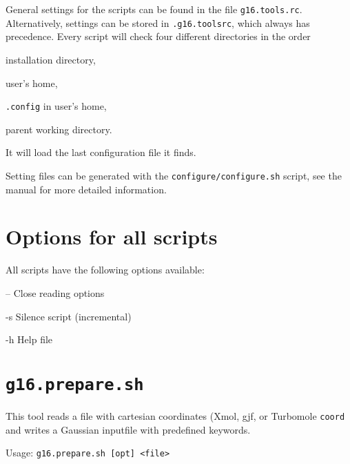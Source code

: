 \documentclass[final, a4paper, columns=3, margin=1.0cm, 10pt]{refcard}
\begin{document}
General settings for the scripts can be found in the file \texttt{g16.tools.rc}.
Alternatively, settings can be stored in \texttt{.g16.toolsrc}, 
which always has precedence.
Every script will check four different directories in the order
\begin{enumerate*}
\item installation directory,
\item user's home,
\item \texttt{.config} in user's home,
\item parent working directory.
\end{enumerate*}
It will load the last configuration file it finds.

Setting files can be generated with the \texttt{configure/configure.sh} script,
see the manual for more detailed information.


\section{Options for all scripts}

All scripts have the following options available:

\begin{refcardlist}[labelfont=\ttfamily]
  \item[--      ] Close reading options
  \item[-s      ] Silence script (incremental)
  \item[-h      ] Help file 
\end{refcardlist}

\section{\texttt{g16.prepare.sh}}

This tool reads a file with cartesian coordinates (Xmol, gjf, or Turbomole \texttt{coord}
and writes a Gaussian inputfile with predefined keywords. 

Usage: \texttt{g16.prepare.sh [opt] <file>}
\end{document}
